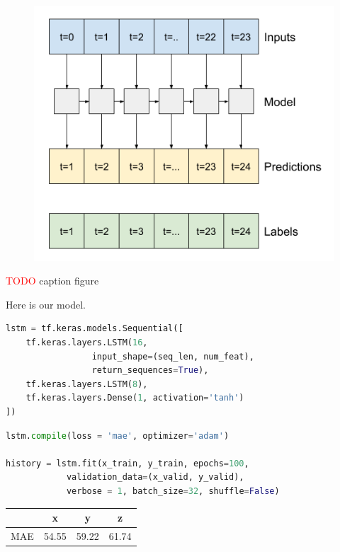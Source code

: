 \begin{figure}[H]
\centering
  \includegraphics[scale=0.35]{img/task_1/fig2.png}
  \caption{}
  \label{fig: }
\end{figure}

\textcolor{red}{TODO} caption figure

Here is our model.

\begin{lstlisting}[language=Python]
lstm = tf.keras.models.Sequential([
	tf.keras.layers.LSTM(16, 
			     input_shape=(seq_len, num_feat), 
			     return_sequences=True),
	tf.keras.layers.LSTM(8),
	tf.keras.layers.Dense(1, activation='tanh')
])
\end{lstlisting}

\begin{lstlisting}[language=Python]
lstm.compile(loss = 'mae', optimizer='adam')

history = lstm.fit(x_train, y_train, epochs=100, 
			validation_data=(x_valid, y_valid), 
			verbose = 1, batch_size=32, shuffle=False)
\end{lstlisting}

\begin{center}
\begin{tabular}{| c | c | c | c |} 
\hline
 & x & y & z  \\ [0.5ex] 
\hline
\hline
MAE & 54.55 & 59.22 & 61.74 \\
\hline
\end{tabular}
\end{center}

